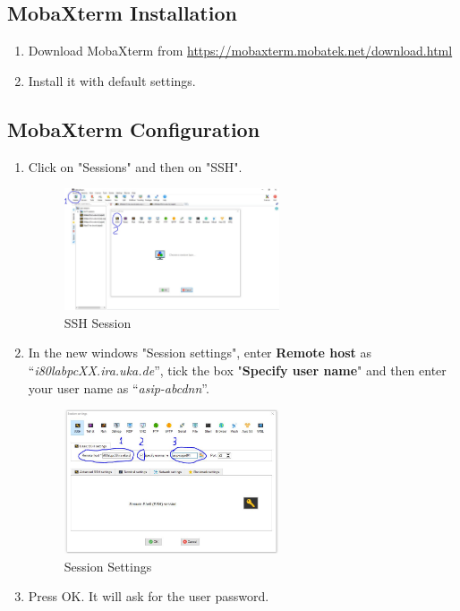 \subsection{MobaXterm Installation}
\begin{enumerate}
	\item Download MobaXterm from \url{https://mobaxterm.mobatek.net/download.html}
	\item Install it with default settings.
\end{enumerate}
\subsection{MobaXterm Configuration}
\begin{enumerate}[resume]
	\item Click on "Sessions" and then on "SSH".
\begin{figure}[!htb]
	\centering
	\includegraphics[width=0.6\textwidth]{src/images/image14.JPG}
	\caption{SSH Session}
	\label{fig:fig14}
\end{figure}
	\item In the new windows "Session settings", enter \textbf{Remote host} as ``\emph{i80labpcXX.ira.uka.de}'', tick the box "\textbf{Specify user name}" and then enter your user name as ``\emph{asip-abcdnn}''.
\begin{figure}[!htb]
	\centering
	\includegraphics[width=0.6\textwidth]{src/images/image15.JPG}
	\caption{Session Settings}
	\label{fig:fig15}
\end{figure}
	\item Press OK. It will ask for the user password.

\end{enumerate}

